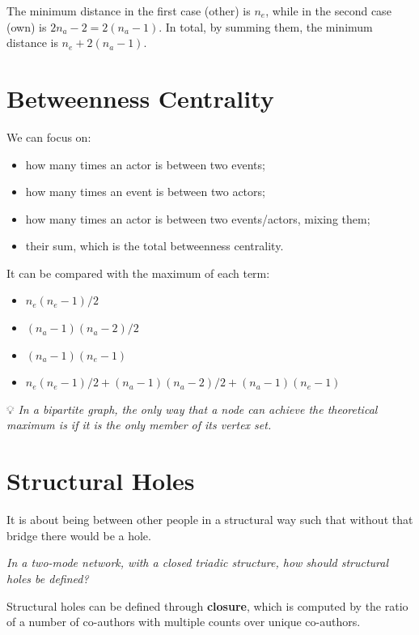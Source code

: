 \documentclass[
  notitlepage,
  onecolumn,
  openany]{book}
\providecommand{\tightlist}{%
  \setlength{\itemsep}{0pt}\setlength{\parskip}{0pt}}
\begin{document}
The minimum distance in the first case (other) is \(n_e\), while in the second case (own) is \(2n_a-2 = 2(n_a-1)\). In total, by summing them, the minimum distance is \(n_e+2(n_a-1)\).

\hypertarget{betweenness-centrality-1}{%
\section{Betweenness Centrality}\label{betweenness-centrality-1}}

We can focus on:

\begin{itemize}
\tightlist
\item
  how many times an actor is between two events;
\item
  how many times an event is between two actors;
\item
  how many times an actor is between two events/actors, mixing them;
\item
  their sum, which is the total betweenness centrality.
\end{itemize}

It can be compared with the maximum of each term:

\begin{itemize}
\tightlist
\item
  \(n_e(n_e-1)/2\)
\item
  \((n_a-1)(n_a-2)/2\)
\item
  \((n_a-1)(n_e-1)\)
\item
  \(n_e(n_e-1)/2+(n_a-1)(n_a-2)/2+(n_a-1)(n_e-1)\)
\end{itemize}

💡 \emph{In a bipartite graph, the only way that a node can achieve the theoretical maximum is if it is the only member of its vertex set.}

\hypertarget{structural-holes}{%
\section{Structural Holes}\label{structural-holes}}

It is about being between other people in a structural way such that without that bridge there would be a hole.

\emph{In a two-mode network, with a closed triadic structure, how should structural holes be defined?}

Structural holes can be defined through \textbf{closure}, which is computed by the ratio of a number of co-authors with multiple counts over unique co-authors.
\end{document}
